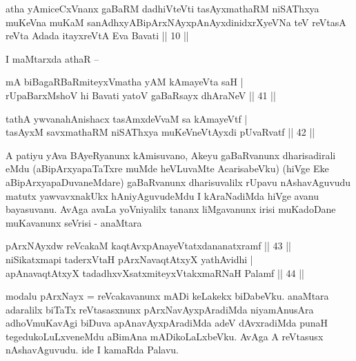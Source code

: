 
\begin{shl}
atha yAmiceCxVnanx gaBaRM dadhiVteVti tasAyxmathaRM niSAThxya muKeVna muKaM sanAdhxyABipArxNAyxpAnAyxdinidxrXyeVNa teV reVtasA reVta Adada itayxreVtA Eva Bavati || 10 ||
\end{shl}

\begin{artha}
I maMtarxda athaR --
\end{artha}

\begin{shl}
mA biBagaRBaRmiteyxVmatha yAM kAmayeVta saH | \\
rUpaBarxMshoV hi Bavati yatoV gaBaRsayx dhAraNeV \hfill|| 41 || 
\end{shl}

\begin{shl}
tathA ywvanahAnishacx tasAmxdeVvaM sa kAmayeVtf | \\
tasAyxM savxmathaRM niSAThxya muKeVneVtAyxdi pUvaRvatf \hfill|| 42 || 
\end{shl}

\begin{artha}
A patiyu yAva BAyeRyanunx kAmisuvano, Akeyu gaBaRvanunx dharisadirali 
eMdu (aBipArxyapaTaTxre muMde heVLuvaMte AcarisabeVku) (hiVge Eke 
aBipArxyapaDuvaneMdare) gaBaRvanunx dharisuvalilx rUpavu nAshavAguvudu 
matutx yawvavxnakUkx hAniyAguvudeMdu I kAraNadiMda hiVge avanu 
bayasuvanu. AvAga avaLa yoVniyalilx tananx liMgavanunx irisi 
muKadoDane muKavanunx seVrisi - anaMtara
\end{artha}

\begin{shl}
pArxNAyx\s \s dw reVcakaM kaqtAvx\s pAnayeVtatxdananatxramf \hfill|| 43 || \\
niSikatxmapi taderxVtaH pArxNavaqtAtxyX yathAvidhi | \\
apAnavaqtAtxyX tadadhxvXsatxmiteyxVtakxmaRNaH Palamf \hfill|| 44 || 
\end{shl}

\begin{artha}
modalu pArxNayx = reVcakavanunx mADi keLakekx biDabeVku. anaMtara 
adaralilx biTaTx reVtasasxnunx pArxNavAyxpAradiMda niyamAnusAra 
adhoVmuKavAgi biDuva apAnavAyxpAradiMda adeV dAvxradiMda punaH 
tegedukoLuLxveneMdu aBimAna mADikoLaLxbeVku. AvAga A reVtasusx 
nAshavAguvudu. ide I kamaRda Palavu.
\end{artha}


